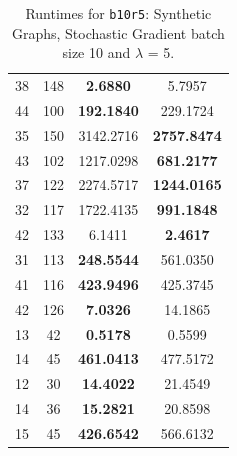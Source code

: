 \documentclass{article}
\begin{document}
\begin{table}[h]
\begin{tabular}{lccc}
38 & 148 & \textbf{2.6880} & 5.7957 \\
44 & 100 & \textbf{192.1840} & 229.1724 \\
35 & 150 & 3142.2716 & \textbf{2757.8474} \\
43 & 102 & 1217.0298 & \textbf{681.2177} \\
37 & 122 & 2274.5717 & \textbf{1244.0165} \\
32 & 117 & 1722.4135 & \textbf{991.1848} \\
42 & 133 & 6.1411 & \textbf{2.4617} \\
31 & 113 & \textbf{248.5544} & 561.0350 \\
41 & 116 & \textbf{423.9496} & 425.3745 \\
42 & 126 & \textbf{7.0326} & 14.1865 \\
13 & 42 & \textbf{0.5178} & 0.5599 \\
14 & 45 & \textbf{461.0413} & 477.5172 \\
12 & 30 & \textbf{14.4022} & 21.4549 \\
14 & 36 & \textbf{15.2821} & 20.8598 \\
15 & 45 & \textbf{426.6542} & 566.6132 \\
\bottomrule
\end{tabular}
\caption{Runtimes for \texttt{b10r5}: Synthetic Graphs, Stochastic Gradient batch size 10 and $\lambda$ = 5.}
\end{table}
\end{document}
